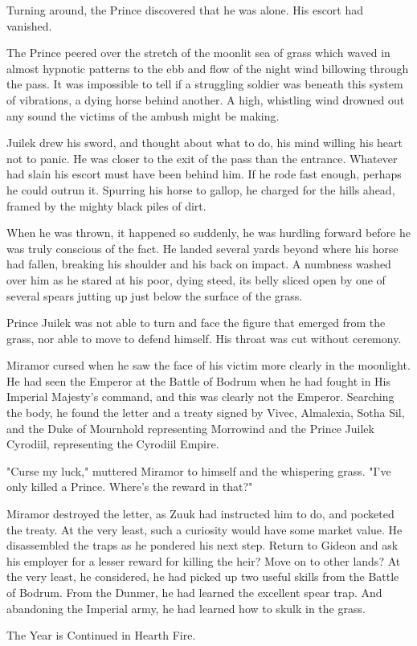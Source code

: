 Turning around, the Prince discovered that he was alone. His escort had vanished.

The Prince peered over the stretch of the moonlit sea of grass which waved in almost hypnotic patterns to the ebb and flow of the night wind billowing through the pass. It was impossible to tell if a struggling soldier was beneath this system of vibrations, a dying horse behind another. A high, whistling wind drowned out any sound the victims of the ambush might be making.

Juilek drew his sword, and thought about what to do, his mind willing his heart not to panic. He was closer to the exit of the pass than the entrance. Whatever had slain his escort must have been behind him. If he rode fast enough, perhaps he could outrun it. Spurring his horse to gallop, he charged for the hills ahead, framed by the mighty black piles of dirt.

When he was thrown, it happened so suddenly, he was hurdling forward before he was truly conscious of the fact. He landed several yards beyond where his horse had fallen, breaking his shoulder and his back on impact. A numbness washed over him as he stared at his poor, dying steed, its belly sliced open by one of several spears jutting up just below the surface of the grass.

Prince Juilek was not able to turn and face the figure that emerged from the grass, nor able to move to defend himself. His throat was cut without ceremony.

Miramor cursed when he saw the face of his victim more clearly in the moonlight. He had seen the Emperor at the Battle of Bodrum when he had fought in His Imperial Majesty's command, and this was clearly not the Emperor. Searching the body, he found the letter and a treaty signed by Vivec, Almalexia, Sotha Sil, and the Duke of Mournhold representing Morrowind and the Prince Juilek Cyrodiil, representing the Cyrodiil Empire.

"Curse my luck," muttered Miramor to himself and the whispering grass. "I've only killed a Prince. Where's the reward in that?"

Miramor destroyed the letter, as Zuuk had instructed him to do, and pocketed the treaty. At the very least, such a curiosity would have some market value. He disassembled the traps as he pondered his next step. Return to Gideon and ask his employer for a lesser reward for killing the heir? Move on to other lands? At the very least, he considered, he had picked up two useful skills from the Battle of Bodrum. From the Dunmer, he had learned the excellent spear trap. And abandoning the Imperial army, he had learned how to skulk in the grass.

The Year is Continued in Hearth Fire.